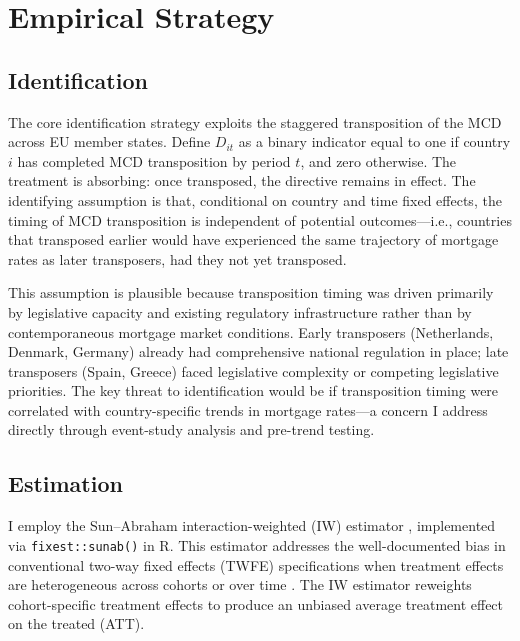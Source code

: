 \documentclass[12pt]{article}
\begin{document}
\section{Empirical Strategy}
\label{sec:strategy}

\subsection{Identification}

The core identification strategy exploits the staggered transposition of the MCD across EU member states. Define $D_{it}$ as a binary indicator equal to one if country $i$ has completed MCD transposition by period $t$, and zero otherwise. The treatment is absorbing: once transposed, the directive remains in effect. The identifying assumption is that, conditional on country and time fixed effects, the timing of MCD transposition is independent of potential outcomes---i.e., countries that transposed earlier would have experienced the same trajectory of mortgage rates as later transposers, had they not yet transposed.

This assumption is plausible because transposition timing was driven primarily by legislative capacity and existing regulatory infrastructure rather than by contemporaneous mortgage market conditions. Early transposers (Netherlands, Denmark, Germany) already had comprehensive national regulation in place; late transposers (Spain, Greece) faced legislative complexity or competing legislative priorities. The key threat to identification would be if transposition timing were correlated with country-specific trends in mortgage rates---a concern I address directly through event-study analysis and pre-trend testing.

\subsection{Estimation}

I employ the Sun--Abraham interaction-weighted (IW) estimator \citep{sun_abraham_2021}, implemented via \texttt{fixest::sunab()} in R. This estimator addresses the well-documented bias in conventional two-way fixed effects (TWFE) specifications when treatment effects are heterogeneous across cohorts or over time \citep{goodman_bacon_2021, de_chaisemartin_dhaultfoeuille_2020, borusyak_2024_revisiting, callaway_santanna_2021, roth_2023_pretest}. The IW estimator reweights cohort-specific treatment effects to produce an unbiased average treatment effect on the treated (ATT).
\end{document}
